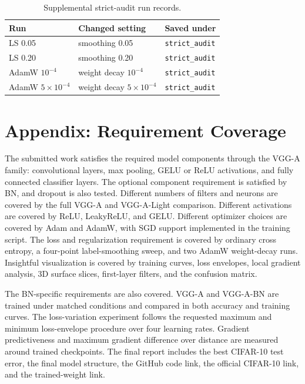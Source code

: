 \documentclass[10pt,twocolumn]{article}
\begin{document}
\begin{table}[H]
\centering
\caption{Supplemental strict-audit run records.}
\label{tab:strict-records}
\scriptsize
\begin{tabular}{p{}p{}p{}}
\toprule
Run & Changed setting & Saved under\\
\midrule
LS 0.05 & smoothing 0.05 & \texttt{strict\_audit}\\
LS 0.20 & smoothing 0.20 & \texttt{strict\_audit}\\
AdamW $10^{-4}$ & weight decay $10^{-4}$ & \texttt{strict\_audit}\\
AdamW $5\times10^{-4}$ & weight decay $5\times10^{-4}$ & \texttt{strict\_audit}\\
\bottomrule
\end{tabular}
\end{table}

\section{Appendix: Requirement Coverage}
The submitted work satisfies the required model components through the VGG-A family: convolutional layers, max pooling, GELU or ReLU activations, and fully connected classifier layers. The optional component requirement is satisfied by BN, and dropout is also tested. Different numbers of filters and neurons are covered by the full VGG-A and VGG-A-Light comparison. Different activations are covered by ReLU, LeakyReLU, and GELU. Different optimizer choices are covered by Adam and AdamW, with SGD support implemented in the training script. The loss and regularization requirement is covered by ordinary cross entropy, a four-point label-smoothing sweep, and two AdamW weight-decay runs. Insightful visualization is covered by training curves, loss envelopes, local gradient analysis, 3D surface slices, first-layer filters, and the confusion matrix.

The BN-specific requirements are also covered. VGG-A and VGG-A-BN are trained under matched conditions and compared in both accuracy and training curves. The loss-variation experiment follows the requested maximum and minimum loss-envelope procedure over four learning rates. Gradient predictiveness and maximum gradient difference over distance are measured around trained checkpoints. The final report includes the best CIFAR-10 test error, the final model structure, the GitHub code link, the official CIFAR-10 link, and the trained-weight link.
\end{document}
